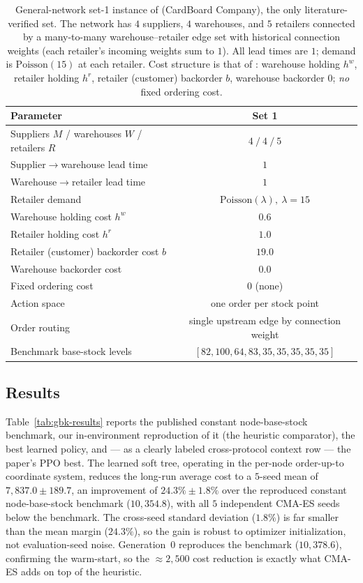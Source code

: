 \documentclass[11pt]{article}
\begin{document}
\begin{table}[!htbp]
\centering
\caption{General-network set-1 instance of \citet{geevers2024cardboard} (CardBoard Company), the only
literature-verified set. The network has $4$ suppliers, $4$ warehouses, and $5$ retailers connected
by a many-to-many warehouse--retailer edge set with historical connection weights (each retailer's
incoming weights sum to $1$). All lead times are $1$; demand is $\mathrm{Poisson}(15)$ at each
retailer. Cost structure is that of \citet{kunnumkal2011}: warehouse holding $h^w$, retailer holding
$h^r$, retailer (customer) backorder $b$, warehouse backorder $0$; \emph{no} fixed ordering cost.}
\label{tab:gbk-params}
\begin{tabular}{lc}
\toprule
Parameter & Set 1 \\
\midrule
\addlinespace[2pt]
Suppliers $M$ / warehouses $W$ / retailers $R$ & $4\ /\ 4\ /\ 5$ \\
Supplier$\to$warehouse lead time & $1$ \\
Warehouse$\to$retailer lead time & $1$ \\
Retailer demand & $\mathrm{Poisson}(\lambda),\ \lambda=15$ \\
\addlinespace[2pt]
Warehouse holding cost $h^w$ & $0.6$ \\
Retailer holding cost $h^r$ & $1.0$ \\
Retailer (customer) backorder cost $b$ & $19.0$ \\
Warehouse backorder cost & $0.0$ \\
Fixed ordering cost & $0$ (none) \\
\addlinespace[2pt]
Action space & one order per stock point \\
Order routing & single upstream edge by connection weight \\
Benchmark base-stock levels & $[82,100,64,83,35,35,35,35,35]$ \\
\bottomrule
\end{tabular}
\end{table}
\FloatBarrier

\subsection{Results}
\label{sec:gbk-results}

Table~\ref{tab:gbk-results} reports the published constant node-base-stock benchmark, our
in-environment reproduction of it (the heuristic comparator), the best learned policy, and --- as a clearly labeled
cross-protocol context row --- the paper's PPO best. The learned soft tree, operating in the
per-node order-up-to coordinate system, reduces the long-run average cost to a $5$-seed mean of
$7{,}837.0\pm189.7$, an improvement of $24.3\%\pm1.8\%$ over the reproduced constant node-base-stock
benchmark ($10{,}354.8$), with all $5$ independent CMA-ES seeds below the benchmark. The cross-seed standard
deviation ($1.8\%$) is far smaller than the mean margin ($24.3\%$), so the gain is robust to optimizer
initialization, not evaluation-seed noise. Generation~0 reproduces the benchmark ($10{,}378.6$),
confirming the warm-start, so the $\approx 2{,}500$ cost reduction is exactly what CMA-ES adds on top of
the heuristic.
\end{document}
